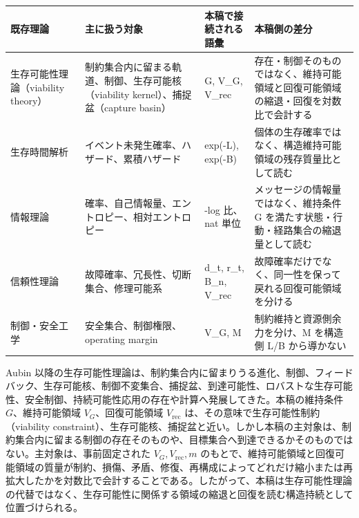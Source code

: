 \documentclass[12pt,a4paper]{article}
\begin{document}
{\def\LTcaptype{table} %
\begin{longtable}[]{@{}
  >{\raggedright\arraybackslash}p{}
  >{\raggedright\arraybackslash}p{}
  >{\raggedright\arraybackslash}p{}
  >{\raggedright\arraybackslash}p{}@{}}
\toprule\noalign{}
\begin{minipage}[b]{\linewidth}\raggedright
既存理論
\end{minipage} & \begin{minipage}[b]{\linewidth}\raggedright
主に扱う対象
\end{minipage} & \begin{minipage}[b]{\linewidth}\raggedright
本稿で接続される語彙
\end{minipage} & \begin{minipage}[b]{\linewidth}\raggedright
本稿側の差分
\end{minipage} \\
\midrule\noalign{}
\endhead
\bottomrule\noalign{}
\endlastfoot
生存可能性理論（viability theory） & 制約集合内に留まる軌道、制御、生存可能核（viability kernel）、捕捉盆（capture basin） & G, V\_G, V\_rec & 存在・制御そのものではなく、維持可能領域と回復可能領域の縮退・回復を対数比で会計する \\
生存時間解析 & イベント未発生確率、ハザード、累積ハザード & exp(-L), exp(-B) & 個体の生存確率ではなく、構造維持可能領域の残存質量比として読む \\
情報理論 & 確率、自己情報量、エントロピー、相対エントロピー & -log 比、nat 単位 & メッセージの情報量ではなく、維持条件 G を満たす状態・行動・経路集合の縮退量として読む \\
信頼性理論 & 故障確率、冗長性、切断集合、修理可能系 & d\_t, r\_t, B\_n, V\_rec & 故障確率だけでなく、同一性を保って戻れる回復可能領域を分ける \\
制御・安全工学 & 安全集合、制御権限、operating margin & V\_G, M & 制約維持と資源側余力を分け、M を構造側 L/B から導かない \\
\end{longtable}
}

Aubin 以降の生存可能性理論は、制約集合内に留まりうる進化、制御、フィードバック、生存可能核、制御不変集合、捕捉盆、到達可能性、ロバストな生存可能性、安全制御、持続可能性応用の存在や計算へ発展してきた。本稿の維持条件 \(G\)、維持可能領域 \(V_{G}\)、回復可能領域 \(V_{\mathrm{rec}}\) は、その意味で生存可能性制約（viability constraint）、生存可能核、捕捉盆と近い。しかし本稿の主対象は、制約集合内に留まる制御の存在そのものや、目標集合へ到達できるかそのものではない。主対象は、事前固定された \(V_{G},V_{\mathrm{rec}},m\) のもとで、維持可能領域と回復可能領域の質量が制約、損傷、矛盾、修復、再構成によってどれだけ縮小または再拡大したかを対数比で会計することである。したがって、本稿は生存可能性理論の代替ではなく、生存可能性に関係する領域の縮退と回復を読む構造持続として位置づけられる。
\end{document}
